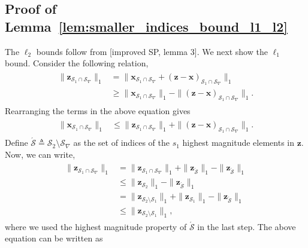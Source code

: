 \documentclass[journal]{IEEEtran}
\newcommand{\mbx}{\mathbf{x}}
\begin{document}
\subsection{Proof of Lemma~\ref{lem:smaller_indices_bound_l1_l2}}
The $\ell_2$ bounds follow from [improved SP, lemma 3]. We next show the $\ell_1$ bound.
Consider the following relation,
\begin{eqnarray*}
\begin{array}{rl}
\|{\mathbf{z}}_{\mathcal{S}_1\cap\mathcal{S}_{\nabla}}\|_1 & =  \|\mbx_{\mathcal{S}_1\cap\mathcal{S}_{\nabla}} + \left({\mathbf{z}}-\mbx\right)_{\mathcal{S}_1\cap\mathcal{S}_{\nabla}}\|_1 \\
& \geq \|\mbx_{\mathcal{S}_1\cap\mathcal{S}_{\nabla}}\|_1 -\| \left({\mathbf{z}}-\mbx\right)_{\mathcal{S}_1\cap\mathcal{S}_{\nabla}}\|_1.
\end{array}
\end{eqnarray*}
Rearranging the terms in the above equation gives
\begin{eqnarray}
\label{eq:index_lemma_bound_l2_1}
\begin{array}{rl}
\|\mbx_{\mathcal{S}_1\cap\mathcal{S}_{\nabla}}\|_1 & \leq \|{\mathbf{z}}_{\mathcal{S}_1\cap\mathcal{S}_{\nabla}}\|_1 + \| \left({\mathbf{z}}-\mbx\right)_{\mathcal{S}_1\cap\mathcal{S}_{\nabla}}\|_1.
\end{array}
\end{eqnarray}
Define $\acute{\mathcal{S}} \triangleq \mathcal{S}_2 \setminus \mathcal{S}_{\nabla}$ as the set of indices of the $s_1$ highest magnitude elements in ${\mathbf{z}}$. Now, we can write,
\begin{eqnarray*}
\begin{array}{rl}
\|{\mathbf{z}}_{\mathcal{S}_1\cap\mathcal{S}_{\nabla}}\|_1 & = \|{\mathbf{z}}_{\mathcal{S}_1\cap\mathcal{S}_{\nabla}}\|_1 + \|{\mathbf{z}}_{\acute{\mathcal{S}}}\|_1 - \|{\mathbf{z}}_{\acute{\mathcal{S}}}\|_1 \\
& \leq \|{\mathbf{z}}_{\mathcal{S}_2}\|_1 -\|{\mathbf{z}}_{\acute{\mathcal{S}}}\|_1 \\
& = \|{\mathbf{z}}_{\mathcal{S}_2\setminus\mathcal{S}_1}\|_1 + \|{\mathbf{z}}_{\mathcal{S}_1}\|_1 - \|{\mathbf{z}}_{\acute{\mathcal{S}}}\|_1 \\
& \leq \|{\mathbf{z}}_{\mathcal{S}_2\setminus\mathcal{S}_1}\|_1,
\end{array}
\end{eqnarray*}
where we used the highest magnitude property of $\acute{\mathcal{S}}$ in the last step. The above equation can be written as
\end{document}
